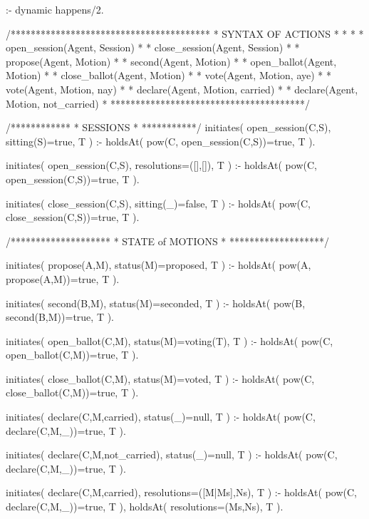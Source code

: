 \begin{prologinline}
:- dynamic
    happens/2.

/****************************************
 * SYNTAX OF ACTIONS                    *
 *                                      *
 * open_session(Agent, Session)         *
 * close_session(Agent, Session)        *
 * propose(Agent, Motion)               *
 * second(Agent, Motion)                *
 * open_ballot(Agent, Motion)           *
 * close_ballot(Agent, Motion)          *
 * vote(Agent, Motion, aye)             *
 * vote(Agent, Motion, nay)             *
 * declare(Agent, Motion, carried)      *
 * declare(Agent, Motion, not_carried)  *
 ***************************************/                          

/************
 * SESSIONS *
 ***********/
initiates( open_session(C,S), sitting(S)=true, T ) :-
	holdsAt( pow(C, open_session(C,S))=true, T ).

initiates( open_session(C,S), resolutions=([],[]), T ) :-
	holdsAt( pow(C, open_session(C,S))=true, T ).

initiates( close_session(C,S), sitting(_)=false, T ) :-
	holdsAt( pow(C, close_session(C,S))=true, T ).

/********************
 * STATE of MOTIONS *
 *******************/


initiates( propose(A,M), status(M)=proposed, T ) :-
	holdsAt( pow(A, propose(A,M))=true, T ).

initiates( second(B,M), status(M)=seconded, T ) :-
	holdsAt( pow(B, second(B,M))=true, T ).

initiates( open_ballot(C,M), status(M)=voting(T), T ) :-
	holdsAt( pow(C, open_ballot(C,M))=true, T ).

initiates( close_ballot(C,M), status(M)=voted, T ) :-
	holdsAt( pow(C, close_ballot(C,M))=true, T ).

initiates( declare(C,M,carried), status(_)=null, T ) :-
	holdsAt( pow(C, declare(C,M,_))=true, T ).

initiates( declare(C,M,not_carried), status(_)=null, T ) :-
	holdsAt( pow(C, declare(C,M,_))=true, T ).

initiates( declare(C,M,carried), resolutions=([M|Ms],Ns), T ) :-
	holdsAt( pow(C, declare(C,M,_))=true, T ),
	holdsAt( resolutions=(Ms,Ns), T ).


\end{prologinline}
